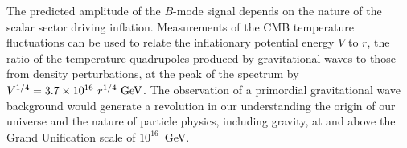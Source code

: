 
The predicted amplitude of the $B$-mode signal depends on the nature of the scalar sector driving inflation. 
Measurements of the CMB temperature fluctuations can be used to relate the inflationary potential energy $V$ to $r$, the 
ratio of the temperature quadrupoles produced by gravitational waves to those from density perturbations, at the peak 
of the spectrum by $V^{1/4} = 3.7 \times 10^{16} \ r^{1/4}\,\, {\rm GeV}$. The observation of a primordial gravitational 
wave background would generate a revolution in our understanding the origin of our universe and the nature of 
particle physics, including gravity, at and above the Grand Unification scale of $10^{16}$~GeV.  

